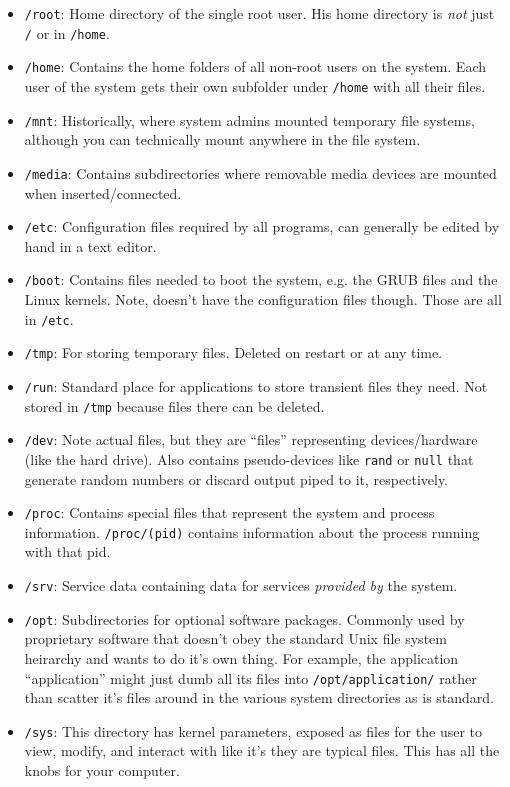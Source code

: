 \documentclass[12pt]{article}
\theoremstyle{plain}
\theoremstyle{definition}
\theoremstyle{remark}
\begin{document}
\begin{itemize}
  \item \texttt{/root}:
    Home directory of the single root user.
    His home directory is \emph{not} just \texttt{/} or in
    \texttt{/home}.

  \item \texttt{/home}:
    Contains the home folders of all non-root users on the system.
    Each user of the system gets their own subfolder under
    \texttt{/home} with all their files.
  \item \texttt{/mnt}:
    Historically, where system admins mounted temporary file systems,
    although you can technically mount anywhere in the file system.
  \item \texttt{/media}:
    Contains subdirectories where removable media devices are mounted
    when inserted/connected.
  \item \texttt{/etc}:
    Configuration files required by all programs, can generally be
    edited by hand in a text editor.
  \item \texttt{/boot}:
    Contains files needed to boot the system, e.g. the GRUB files and
    the Linux kernels.
    Note, doesn't have the configuration files though. Those are all in
    \texttt{/etc}.
  \item \texttt{/tmp}:
    For storing temporary files. Deleted on restart or at any time.
  \item \texttt{/run}:
    Standard place for applications to store transient files they need.
    Not stored in \texttt{/tmp} because files there can be deleted.
  \item \texttt{/dev}:
    Note actual files, but they are ``files'' representing
    devices/hardware (like the hard drive).
    Also contains pseudo-devices like \texttt{rand} or \texttt{null}
    that generate random numbers or discard output piped to it,
    respectively.
  \item \texttt{/proc}:
    Contains special files that represent the system and process
    information.
    \texttt{/proc/(pid)} contains information about the process running
    with that pid.

  \item \texttt{/srv}: Service data containing data for services
    \emph{provided by} the system.
  \item \texttt{/opt}:
    Subdirectories for optional software packages.
    Commonly used by proprietary software that doesn't obey the standard
    Unix file system heirarchy and wants to do it's own thing.
    For example, the application ``application'' might just dumb all
    its files into \texttt{/opt/application/} rather than scatter it's
    files around in the various system directories as is standard.

  \item \texttt{/sys}:
    This directory has kernel parameters, exposed as files for the user
    to view, modify, and interact with like it's they are typical files.
    This has all the knobs for your computer.
\end{itemize}
\end{document}

